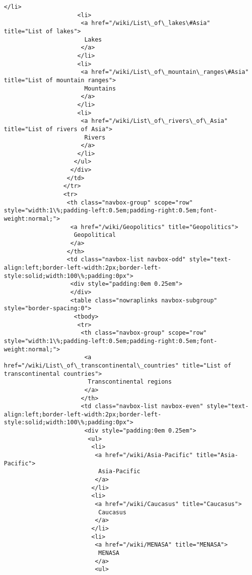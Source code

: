 \documentclass[11pt]{article}
\begin{document}
\begin{Verbatim}[commandchars=\\\{\}]
                     </li>
                     <li>
                      <a href="/wiki/List\_of\_lakes\#Asia" title="List of lakes">
                       Lakes
                      </a>
                     </li>
                     <li>
                      <a href="/wiki/List\_of\_mountain\_ranges\#Asia" title="List of mountain ranges">
                       Mountains
                      </a>
                     </li>
                     <li>
                      <a href="/wiki/List\_of\_rivers\_of\_Asia" title="List of rivers of Asia">
                       Rivers
                      </a>
                     </li>
                    </ul>
                   </div>
                  </td>
                 </tr>
                 <tr>
                  <th class="navbox-group" scope="row" style="width:1\%;padding-left:0.5em;padding-right:0.5em;font-weight:normal;">
                   <a href="/wiki/Geopolitics" title="Geopolitics">
                    Geopolitical
                   </a>
                  </th>
                  <td class="navbox-list navbox-odd" style="text-align:left;border-left-width:2px;border-left-style:solid;width:100\%;padding:0px">
                   <div style="padding:0em 0.25em">
                   </div>
                   <table class="nowraplinks navbox-subgroup" style="border-spacing:0">
                    <tbody>
                     <tr>
                      <th class="navbox-group" scope="row" style="width:1\%;padding-left:0.5em;padding-right:0.5em;font-weight:normal;">
                       <a href="/wiki/List\_of\_transcontinental\_countries" title="List of transcontinental countries">
                        Transcontinental regions
                       </a>
                      </th>
                      <td class="navbox-list navbox-even" style="text-align:left;border-left-width:2px;border-left-style:solid;width:100\%;padding:0px">
                       <div style="padding:0em 0.25em">
                        <ul>
                         <li>
                          <a href="/wiki/Asia-Pacific" title="Asia-Pacific">
                           Asia-Pacific
                          </a>
                         </li>
                         <li>
                          <a href="/wiki/Caucasus" title="Caucasus">
                           Caucasus
                          </a>
                         </li>
                         <li>
                          <a href="/wiki/MENASA" title="MENASA">
                           MENASA
                          </a>
                          <ul>

\end{Verbatim}
\end{document}
